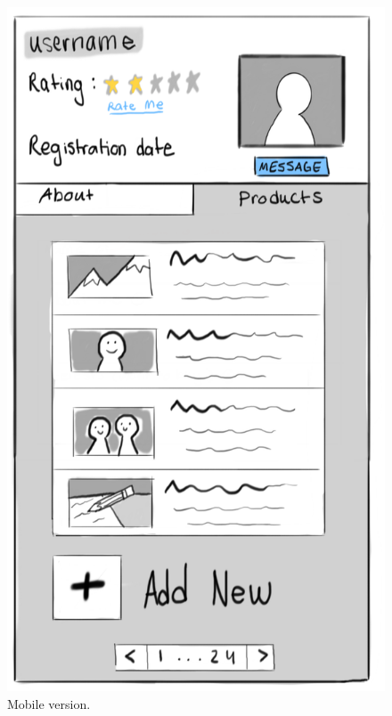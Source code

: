 \documentclass[]{article}
\begin{document}
\begin{enumerate}
			\begin{figure}
			  \includegraphics[width=\linewidth]{./pictures/profile_product.png}
			  \caption{Mobile version.}
			  \label{fig:mobile3}
			\end{figure}
			

\end{enumerate}
\end{document}
